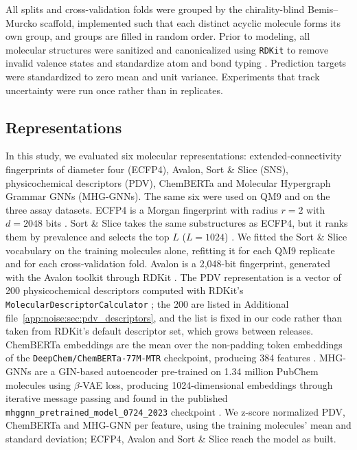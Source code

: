 All splits and cross-validation folds were grouped by the chirality-blind Bemis--Murcko scaffold, implemented such that each distinct acyclic molecule forms its own group, and groups are filled in random order. Prior to modeling, all molecular structures were sanitized and canonicalized using \texttt{RDKit} to remove invalid valence states and standardize atom and bond typing \citep{rdkit}. Prediction targets were standardized to zero mean and unit variance. Experiments that track uncertainty were run once rather than in replicates.

\subsection{Representations}

In this study, we evaluated six molecular representations: extended-connectivity fingerprints of diameter four (ECFP4), Avalon, Sort \& Slice (SNS), physicochemical descriptors (PDV), ChemBERTa and Molecular Hypergraph Grammar GNNs (MHG-GNNs). The same six were used on QM9 and on the three assay datasets. ECFP4 is a Morgan fingerprint with radius $r = 2$ with $d = 2048$ bits \citep{rogers2010, rdkit}. Sort \& Slice takes the same substructures as ECFP4, but it ranks them by prevalence and selects the top $L$ ($L=1024$) \citep{sns}. We fitted the Sort \& Slice vocabulary on the training molecules alone, refitting it for each QM9 replicate and for each cross-validation fold.  Avalon is a 2,048-bit fingerprint, generated with the Avalon toolkit through RDKit \citep{avalon, rdkit}. The PDV representation is a vector of 200 physicochemical descriptors computed with RDKit's \texttt{MolecularDescriptorCalculator} \citep{rdkit, Cherkasov2014}; the 200 are listed in Additional file~\ref{app:noise:sec:pdv_descriptors}, and the list is fixed in our code rather than taken from RDKit's default descriptor set, which grows between releases. ChemBERTa embeddings are the mean over the non-padding token embeddings of the \texttt{DeepChem/ChemBERTa-77M-MTR} checkpoint, producing 384 features \citep{Ahmad2022}. MHG-GNNs are a GIN-based autoencoder pre-trained on 1.34 million PubChem molecules using $\beta$-VAE loss, producing 1024-dimensional embeddings through iterative message passing and found in the published \texttt{mhggnn\_pretrained\_model\_0724\_2023} checkpoint \citep{kishimoto2023}. We z-score normalized PDV, ChemBERTa and MHG-GNN per feature, using the training molecules' mean and standard deviation; ECFP4, Avalon and Sort \& Slice reach the model as built.

